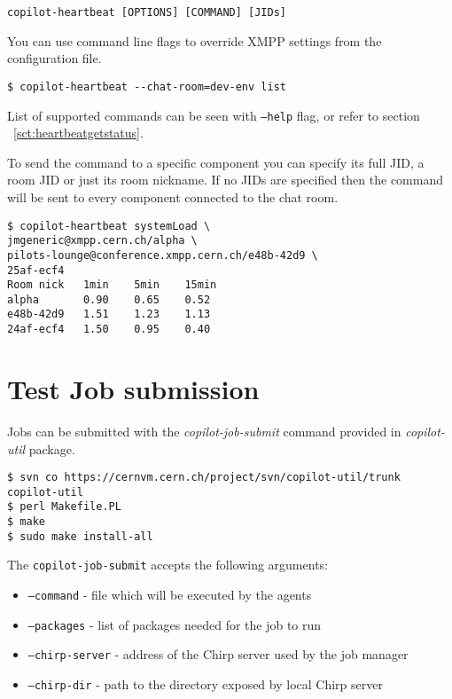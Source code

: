 \lstset{caption=Arguments of copilot-heartbeat utility}
\begin{lstlisting}
copilot-heartbeat [OPTIONS] [COMMAND] [JIDs]
\end{lstlisting}

You can use command line flags to override XMPP settings from the configuration file.

\lstset{caption=Overriding name of the chat room}
\begin{lstlisting}
$ copilot-heartbeat --chat-room=dev-env list
\end{lstlisting}

List of supported commands can be seen with \texttt{--help} flag, or refer to section ~\ref{sct:heartbeatgetstatus}.

To send the command to a specific component you can specify its full JID, a room JID or just its room nickname. If no JIDs are specified then the command will be sent to every component connected to the chat room.

\lstset{caption=Requesting system load from several components}
\begin{lstlisting}
$ copilot-heartbeat systemLoad \
jmgeneric@xmpp.cern.ch/alpha \
pilots-lounge@conference.xmpp.cern.ch/e48b-42d9 \
25af-ecf4
Room nick   1min    5min    15min
alpha       0.90    0.65    0.52
e48b-42d9   1.51    1.23    1.13
24af-ecf4   1.50    0.95    0.40
\end{lstlisting}

\section{Test Job submission}

Jobs can be submitted with the \emph{copilot-job-submit} command provided in \emph{copilot-util} package.

\lstset{caption=Obtaining copilot-util package from SVN}
\begin{lstlisting}
$ svn co https://cernvm.cern.ch/project/svn/copilot-util/trunk copilot-util
$ perl Makefile.PL
$ make
$ sudo make install-all
\end{lstlisting}

The \texttt{copilot-job-submit} accepts the following arguments:
\begin{itemize}
  \item \texttt{--command} - file which will be executed by the agents
  \item \texttt{--packages} - list of packages needed for the job to run
  \item \texttt{--chirp-server} - address of the Chirp server used by the job manager
  \item \texttt{--chirp-dir} - path to the directory exposed by local Chirp server
\end{itemize}

